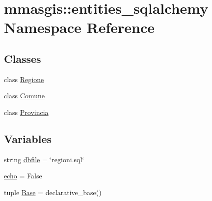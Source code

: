 \hypertarget{namespacemmasgis_1_1entities__sqlalchemy}{
\section{mmasgis::entities\_\-sqlalchemy Namespace Reference}
\label{namespacemmasgis_1_1entities__sqlalchemy}
}
\subsection*{Classes}
\begin{DoxyCompactItemize}
\item 
class \hyperlink{classmmasgis_1_1entities__sqlalchemy_1_1Regione}{Regione}
\item 
class \hyperlink{classmmasgis_1_1entities__sqlalchemy_1_1Comune}{Comune}
\item 
class \hyperlink{classmmasgis_1_1entities__sqlalchemy_1_1Provincia}{Provincia}
\end{DoxyCompactItemize}
\subsection*{Variables}
\begin{DoxyCompactItemize}
\item 
string \hyperlink{namespacemmasgis_1_1entities__sqlalchemy_a2e2321c93ccd6ea1ea8f9873cd075fd5}{dbfile} = \char`\"{}regioni.sql\char`\"{}
\item 
\hyperlink{namespacemmasgis_1_1entities__sqlalchemy_a2af262318ac2c46e862e055590d06498}{echo} = False
\item 
tuple \hyperlink{namespacemmasgis_1_1entities__sqlalchemy_aaa0dddfdd8822aab88b25896958b1804}{Base} = declarative\_\-base()
\end{DoxyCompactItemize}


